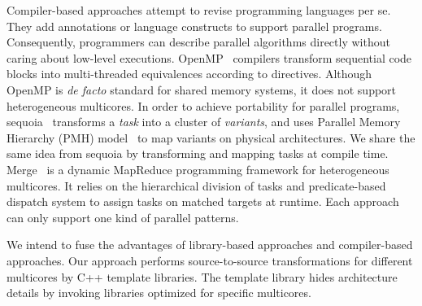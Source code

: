 Compiler-based approaches attempt to revise
programming languages per se. They add annotations or language constructs to
support parallel programs. Consequently, programmers
can describe parallel algorithms directly without caring about low-level executions.
OpenMP~\cite{openmp} compilers transform sequential code blocks into
multi-threaded equivalences according to directives. Although OpenMP
is \textit{de facto} standard for shared memory systems, it does not
support heterogeneous multicores. In order to achieve portability for
parallel programs, sequoia~\cite{sequoia, sequoia-compiler} transforms a \textit{task} into a cluster of
\emph{variants}, and uses Parallel Memory Hierarchy (PMH)
model~\cite{pmh} to map variants on physical architectures.
We share the same idea from sequoia by transforming and mapping tasks
at compile time. Merge~\cite{merge} is a dynamic MapReduce programming
framework for heterogeneous multicores. It relies on the hierarchical division of tasks and predicate-based
dispatch system to assign tasks on matched targets at runtime.
Each approach can only support one kind of parallel patterns. 

We intend to fuse the advantages of library-based approaches and
compiler-based approaches. Our approach performs source-to-source
transformations for different multicores by C++ template libraries.
The template library hides architecture details by invoking libraries
optimized for specific multicores.






